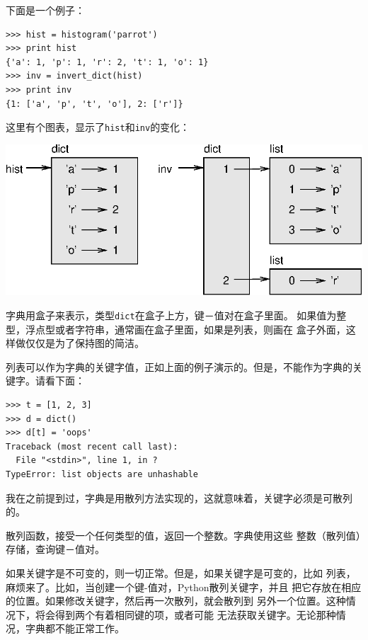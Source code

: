 
下面是一个例子：

\beforeverb
\begin{verbatim}
>>> hist = histogram('parrot')
>>> print hist
{'a': 1, 'p': 1, 'r': 2, 't': 1, 'o': 1}
>>> inv = invert_dict(hist)
>>> print inv
{1: ['a', 'p', 't', 'o'], 2: ['r']}
\end{verbatim}
\afterverb

这里有个图表，显示了{\tt hist}和{\tt inv}的变化：


\beforefig
\centerline{\includegraphics{figs/dict1.eps}}
\afterfig

字典用盒子来表示，类型{\tt dict}在盒子上方，键－值对在盒子里面。
如果值为整型，浮点型或者字符串，通常画在盒子里面，如果是列表，则画在
盒子外面，这样做仅仅是为了保持图的简洁。

列表可以作为字典的关键字值，正如上面的例子演示的。但是，不能作为字典的关键字。请看下面：



\beforeverb
\begin{verbatim}
>>> t = [1, 2, 3]
>>> d = dict()
>>> d[t] = 'oops'
Traceback (most recent call last):
  File "<stdin>", line 1, in ?
TypeError: list objects are unhashable
\end{verbatim}
\afterverb
%

我在之前提到过，字典是用散列方法实现的，这就意味着，关键字必须是可散列的。


散列函数，接受一个任何类型的值，返回一个整数。字典使用这些
整数（散列值）存储，查询键－值对。



如果关键字是不可变的，则一切正常。但是，如果关键字是可变的，比如
列表，麻烦来了。比如，当创建一个键-值对，Python散列关键字，并且
把它存放在相应的位置。如果修改关键字，然后再一次散列，就会散列到
另外一个位置。这种情况下，将会得到两个有着相同键的项，或者可能
无法获取关键字。无论那种情况，字典都不能正常工作。

